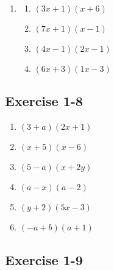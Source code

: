 \begin{enumerate}[itemsep=5pt, label=\textbf{\arabic*}. ]
\item %
\begin{multicols}{2}
\begin{enumerate}[itemsep=5pt, label=\textbf{(\alph*)} ] 
\item $(3x + 1)(x + 6)$%
\item $(7x + 1)(x - 1)$%
\item $(4x - 1)(2x - 1)$%
\item $(6x + 3)(1x - 3)$%
\end{enumerate}
\end{multicols}

\end{enumerate}


\subsection{Exercise 1-8} %

\begin{multicols}{2}
\begin{enumerate}[itemsep=5pt, label=\textbf{\arabic*}. ] 
\item $(3 + a)(2x + 1)$%
\item $(x + 5)(x - 6)$%
\item $(5 - a)(x + 2y)$%
\item $(a - x)(a - 2)$%
\item $(y + 2)(5x - 3)$%
\item $(-a + b)(a + 1)$%
\end{enumerate}
\end{multicols}


\subsection{Exercise 1-9} %

